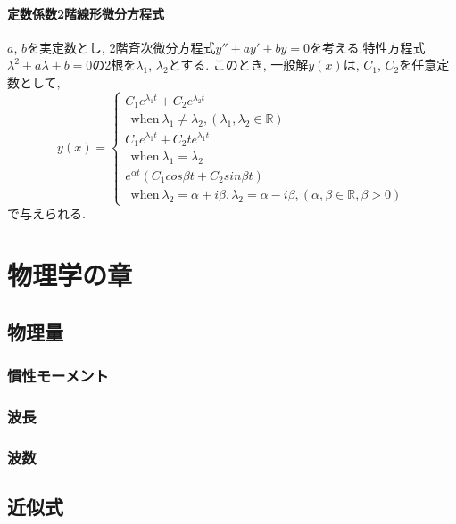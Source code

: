 \documentclass[a4paper, 12pt]{jsreport}
\begin{document}
\subsection{定数係数2階線形微分方程式}
$a$, $b$を実定数とし, 2階斉次微分方程式$y''+ay'+by=0$を考える.特性方程式$\lambda^2+a\lambda+b=0$の2根を$\lambda_{1}$, $\lambda_{2}$とする. このとき, 一般解$y(x)$は, $C_{1}$, $C_{2}$を任意定数として, 
\begin{equation}
    y(x)= \left \{
        \begin{array}{l}
            C_{1}e^{\lambda_{1} t}+C_{2}e^{\lambda_{2} t}\\
            \ \ \mathrm{when} \ \lambda_{1}\neq\lambda_{2}, (\lambda_{1}, \lambda_{2}\in\mathbb{R}) \\
            C_{1}e^{\lambda_{1} t}+C_{2}te^{\lambda_{1} t}\\
            \ \ \mathrm{when} \ \lambda_{1}=\lambda_{2} \\
            e^{\alpha t}(C_{1}cos{\beta t}+C_{2}sin{\beta t}) \\
            \ \ \mathrm{when} \ \lambda_{2}=\alpha+{i\beta}, \lambda_{2}=\alpha-{i\beta}, (\alpha, \beta\in\mathbb{R}, \beta>0)
        \end{array}
    \right.
\end{equation}
で与えられる.

\part{物理学の章}
\chapter{物理量}
\section{慣性モーメント}
\section{波長}

\section{波数}

\chapter{近似式}
\end{document}
